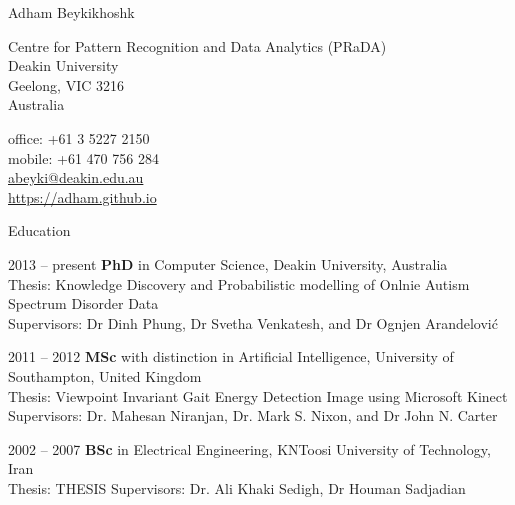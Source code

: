 \documentclass[10pt,letterpaper]{article}
\def\name{Adham Beykikhoshk}
\renewenvironment{itemize}{
  \begin{list}{}{
    \setlength{\leftmargin}{1.5em}
    \setlength{\itemsep}{0.25em}
    \setlength{\parskip}{0pt}
    \setlength{\parsep}{0.25em}
  }
}{
  \end{list}
}
\begin{document}
{\LARGE \name}


\bigskip


\begin{minipage}[t]{0.745\textwidth}
  Centre for Pattern Recognition and Data Analytics (PRaDA) \\
  Deakin University \\
  Geelong, VIC 3216 \\
  Australia
\end{minipage}
\begin{minipage}[t]{0.245\textwidth}
\begin{flushright}
  office: +61 3 5227 2150 \\
  mobile: +61 470 756 284  \\
  \href{mailto:abeyki@deakin.edu.au}{abeyki@deakin.edu.au} \\
  \href{https://adham.github.io/}{https://adham.github.io}
 \end{flushright}
\end{minipage}


\bigskip
\bigskip


\begin{minipage}[t]{0.195\textwidth}
Education
\end{minipage}
\begin{minipage}[t]{0.795\textwidth}

\begin{itemize}
\item 2013 -- present {\bf PhD} in Computer Science, Deakin University, Australia \\
Thesis: Knowledge Discovery and Probabilistic modelling of Onlnie Autism Spectrum Disorder Data \\
Supervisors: Dr Dinh Phung, Dr Svetha Venkatesh, and Dr Ognjen Arandelovi{\'c}

\item 2011 -- 2012 {\bf MSc} with distinction in Artificial Intelligence,  
University of Southampton, United Kingdom \\
Thesis: Viewpoint Invariant Gait Energy Detection Image using Microsoft Kinect 
Supervisors: Dr. Mahesan Niranjan, Dr. Mark S. Nixon, and Dr John N. Carter

\item 2002 -- 2007 {\bf BSc} in Electrical Engineering, KNToosi University of Technology, Iran \\
Thesis: THESIS
Supervisors: Dr. Ali Khaki Sedigh, Dr Houman Sadjadian
\end{itemize}

\end{minipage}
\end{document}
